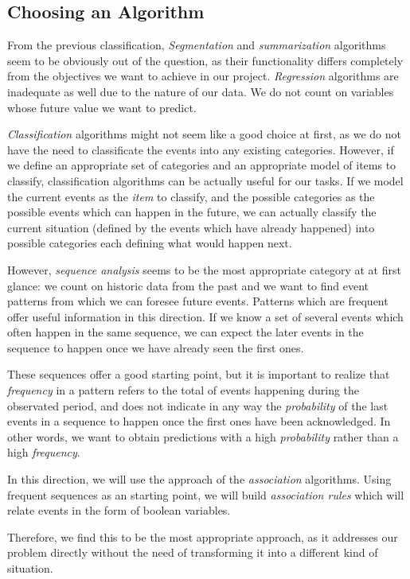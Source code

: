\subsection{Choosing an Algorithm}
\label{sec:algorithms}
From the previous classification, \emph{Segmentation} and \emph{summarization} algorithms seem to be obviously out of the question, as their functionality differs completely from the objectives we want to achieve in our project. \emph{Regression} algorithms are inadequate as well due to the nature of our data. We do not count on variables whose future value we want to predict.

\emph{Classification} algorithms might not seem like a good choice at first, as we do not have the need to classificate the events into any existing categories. However, if we define an appropriate set of categories and an appropriate model of items to classify, classification algorithms can be actually useful for our tasks. If we model the current events as the \emph{item} to classify, and the possible categories as the possible events which can happen in the future, we can actually classify the current situation (defined by the events which have already happened) into possible categories each defining what would happen next.

However, \emph{sequence analysis} seems to be the most appropriate category at at first glance: we count on historic data from the past and we want to find event patterns from which we can foresee future events. Patterns which are frequent offer useful information in this direction. If we know a set of several events which often happen in the same sequence, we can expect the later events in the sequence to happen once we have already seen the first ones.

These sequences offer a good starting point, but it is important to realize that \emph{frequency} in a pattern refers to the total of events happening during the observated period, and does not indicate in any way the \emph{probability} of the last events in a sequence to happen once the first ones have been acknowledged. In other words, we want to obtain predictions with a high \emph{probability} rather than a high \emph{frequency}.

In this direction, we will use the approach of the \emph{association} algorithms. Using frequent sequences as an starting point, we will build \emph{association rules} which will relate events in the form of boolean variables.

Therefore, we find this to be the most appropriate approach, as it addresses our problem directly without the need of transforming it into a different kind of situation.

